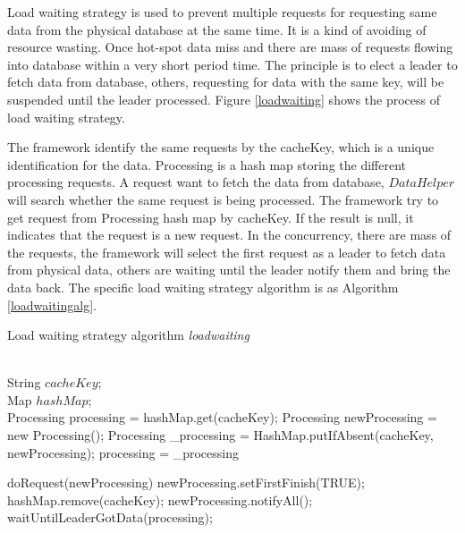 \documentclass{singlecol-new}
\theoremstyle{TH}{
\newtheorem{lemma}{Lemma}
\newtheorem{theorem}[lemma]{Theorem}
\newtheorem{corrolary}[lemma]{Corrolary}
\newtheorem{conjecture}[lemma]{Conjecture}
\newtheorem{proposition}[lemma]{Proposition}
\newtheorem{claim}[lemma]{Claim}
\newtheorem{stheorem}[lemma]{Wrong Theorem}
}
\theoremstyle{THrm}{
\newtheorem{definition}{Definition}[section]
\newtheorem{question}{Question}[section]
\newtheorem{remark}{Remark}
\newtheorem{scheme}{Scheme}
}
\theoremstyle{THhit}{
\newtheorem{case}{Case}[section]
}
\begin{document}
Load waiting strategy is used to prevent multiple requests for requesting same data from the physical database at the same time. It is a kind of avoiding of resource wasting. Once hot-spot data miss and there are mass of requests flowing into database within a very short period time. The principle is to elect a leader to fetch data from database, others, requesting for data with the same key, will be suspended until the leader processed. Figure \ref{loadwaiting} shows the process of load waiting strategy.

The framework identify the same requests by the cacheKey, which is a unique identification for the data. Processing is a hash map storing the different processing requests. A request want to fetch the data from database, $DataHelper$ will search whether the same request is being processed. The framework try to get request from Processing hash map by cacheKey. If the result is null, it indicates that the request is a new request. In the concurrency, there are mass of the requests, the framework will select the first request as a leader to fetch data from physical data, others are waiting until the leader notify them and bring the data back. The specific load waiting strategy algorithm is as Algorithm \ref{loadwaitingalg}.

\begin{algorithm}
\caption{Load waiting strategy algorithm \textit{loadwaiting}}
\label{loadwaitingalg}
\begin{algorithmic}[1]
\REQUIRE ~~\\
  String $cacheKey$;\\
  Map $hashMap$;
\ENSURE ~~\\

\STATE Processing processing = hashMap.get(cacheKey);
\STATE Processing newProcessing = new Processing();
\STATE Processing \_processing = HashMap.putIfAbsent(cacheKey, newProcessing);
\STATE processing = \_processing
\ENDIF
\ENDIF

\STATE doRequest(newProcessing)
\STATE newProcessing.setFirstFinish(TRUE);
\STATE hashMap.remove(cacheKey);
\STATE newProcessing.notifyAll();
\ELSE
\STATE waitUntilLeaderGotData(processing);
\ENDIF


\RETURN

\medskip

\end{algorithmic}
\end{algorithm}
\end{document}
